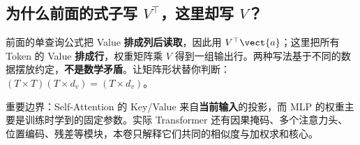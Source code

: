 \subsection{为什么前面的式子写 $V^\top$，这里却写 $V$？}

前面的单查询公式把 Value \textbf{排成列后读取}，因此用 $V^\top\vect{a}$；这里把所有 Token 的 Value \textbf{排成行}，权重矩阵乘 $V$ 得到一组输出行。两种写法基于不同的数据摆放约定，\textbf{不是数学矛盾}。让矩阵形状替你判断：$(T\times T)(T\times d_v)=(T\times d_v)$。

\begin{warningbox}
重要边界：Self-Attention 的 Key/Value 来自\textbf{当前输入}的投影，而 MLP 的权重主要是训练时学到的固定参数。实际 Transformer 还有因果掩码、多个注意力头、位置编码、残差等模块，本卷只解释它们共同的相似度与加权求和核心。
\end{warningbox}
